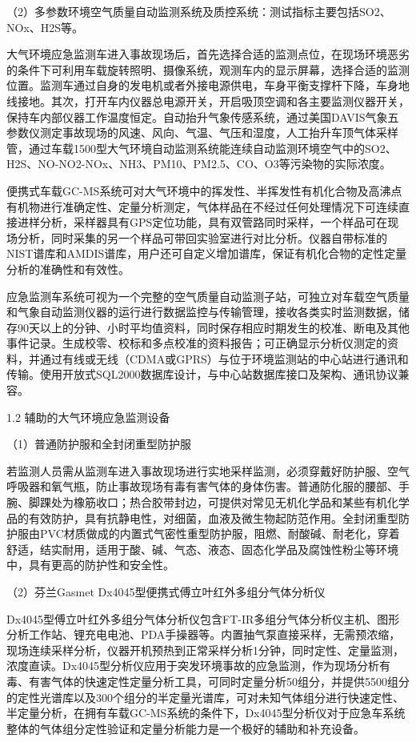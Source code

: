 \documentclass[
]{book}
\begin{document}
（2）多参数环境空气质量自动监测系统及质控系统：测试指标主要包括SO2、NOx、H2S等。

大气环境应急监测车进入事故现场后，首先选择合适的监测点位，在现场环境恶劣的条件下可利用车载旋转照明、摄像系统，观测车内的显示屏幕，选择合适的监测位置。监测车通过自身的发电机或者外接电源供电，车身平衡支撑杆下降，车身地线接地。其次，打开车内仪器总电源开关，开启吸顶空调和各主要监测仪器开关，保持车内部仪器工作温度恒定。自动抬升气象传感系统，通过美国DAVIS气象五参数仪测定事故现场的风速、风向、气温、气压和湿度，人工抬升车顶气体采样管，通过车载1500型大气环境自动监测系统能连续自动监测环境空气中的SO2、H2S、NO-NO2-NOx、NH3、PM10、PM2.5、CO、O3等污染物的实际浓度。

便携式车载GC-MS系统可对大气环境中的挥发性、半挥发性有机化合物及高沸点有机物进行准确定性、定量分析测定，气体样品在不经过任何处理情况下可连续直接进样分析，采样器具有GPS定位功能，具有双管路同时采样，一个样品可在现场分析，同时采集的另一个样品可带回实验室进行对比分析。仪器自带标准的NIST谱库和AMDIS谱库，用户还可自定义增加谱库，保证有机化合物的定性定量分析的准确性和有效性。

应急监测车系统可视为一个完整的空气质量自动监测子站，可独立对车载空气质量和气象自动监测仪器的运行进行数据监控与传输管理，接收各类实时监测数据，储存90天以上的分钟、小时平均值资料，同时保存相应时期发生的校准、断电及其他事件记录。生成校零、校标和多点校准的资料报告；可正确显示分析仪测定的资料，并通过有线或无线（CDMA或GPRS）与位于环境监测站的中心站进行通讯和传输。使用开放式SQL2000数据库设计，与中心站数据库接口及架构、通讯协议兼容。

1.2 辅助的大气环境应急监测设备

（1）普通防护服和全封闭重型防护服

若监测人员需从监测车进入事故现场进行实地采样监测，必须穿戴好防护服、空气呼吸器和氧气瓶，防止事故现场有毒有害气体的身体伤害。普通防化服的腰部、手腕、脚踝处为橡筋收口；热合胶带封边，可提供对常见无机化学品和某些有机化学品的有效防护，具有抗静电性，对细菌，血液及微生物起防范作用。全封闭重型防护服由PVC材质做成的内置式气密性重型防护服，阻燃、耐酸碱、耐老化，穿着舒适，结实耐用，适用于酸、碱、气态、液态、固态化学品及腐蚀性粉尘等环境中，具有更高的防护性和安全性。

（2）芬兰Gasmet Dx4045型便携式傅立叶红外多组分气体分析仪

Dx4045型傅立叶红外多组分气体分析仪包含FT-IR多组分气体分析仪主机、图形分析工作站、锂充电电池、PDA手操器等。内置抽气泵直接采样，无需预浓缩，现场连续采样分析，仪器开机预热到正常采样分析1分钟，同时定性、定量监测，浓度直读。Dx4045型分析仪应用于突发环境事故的应急监测，作为现场分析有毒、有害气体的快速定性定量分析工具，可同时定量分析50组分，并提供5500组分的定性光谱库以及300个组分的半定量光谱库，可对未知气体组分进行快速定性、半定量分析，在拥有车载GC-MS系统的条件下，Dx4045型分析仪对于应急车系统整体的气体组分定性验证和定量分析能力是一个极好的辅助和补充设备。
\end{document}
